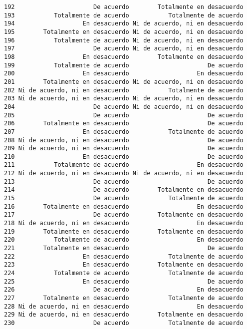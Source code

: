 \documentclass[
  letterpaper,
  DIV=11,
  numbers=noendperiod]{scrartcl}
\begin{document}
\begin{verbatim}
192                      De acuerdo        Totalmente en desacuerdo
193           Totalmente de acuerdo           Totalmente de acuerdo
194                   En desacuerdo Ni de acuerdo, ni en desacuerdo
195        Totalmente en desacuerdo Ni de acuerdo, ni en desacuerdo
196           Totalmente de acuerdo Ni de acuerdo, ni en desacuerdo
197                      De acuerdo Ni de acuerdo, ni en desacuerdo
198                   En desacuerdo        Totalmente en desacuerdo
199           Totalmente de acuerdo                      De acuerdo
200                   En desacuerdo                   En desacuerdo
201        Totalmente en desacuerdo Ni de acuerdo, ni en desacuerdo
202 Ni de acuerdo, ni en desacuerdo           Totalmente de acuerdo
203 Ni de acuerdo, ni en desacuerdo Ni de acuerdo, ni en desacuerdo
204                      De acuerdo Ni de acuerdo, ni en desacuerdo
205                      De acuerdo                      De acuerdo
206        Totalmente en desacuerdo                      De acuerdo
207                   En desacuerdo           Totalmente de acuerdo
208 Ni de acuerdo, ni en desacuerdo                      De acuerdo
209 Ni de acuerdo, ni en desacuerdo                      De acuerdo
210                   En desacuerdo                      De acuerdo
211           Totalmente de acuerdo                   En desacuerdo
212 Ni de acuerdo, ni en desacuerdo Ni de acuerdo, ni en desacuerdo
213                      De acuerdo                      De acuerdo
214                      De acuerdo        Totalmente en desacuerdo
215                      De acuerdo           Totalmente de acuerdo
216        Totalmente en desacuerdo                   En desacuerdo
217                      De acuerdo        Totalmente en desacuerdo
218 Ni de acuerdo, ni en desacuerdo                   En desacuerdo
219        Totalmente en desacuerdo        Totalmente en desacuerdo
220           Totalmente de acuerdo                   En desacuerdo
221        Totalmente en desacuerdo                      De acuerdo
222                   En desacuerdo           Totalmente de acuerdo
223                   En desacuerdo        Totalmente en desacuerdo
224           Totalmente de acuerdo           Totalmente de acuerdo
225                   En desacuerdo                      De acuerdo
226                      De acuerdo                   En desacuerdo
227        Totalmente en desacuerdo           Totalmente de acuerdo
228 Ni de acuerdo, ni en desacuerdo                   En desacuerdo
229 Ni de acuerdo, ni en desacuerdo        Totalmente en desacuerdo
230                      De acuerdo           Totalmente de acuerdo

\end{verbatim}
\end{document}

